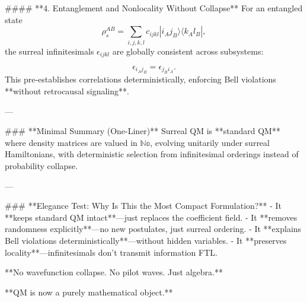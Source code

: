 #### **4. Entanglement and Nonlocality Without Collapse**  
For an entangled state  
\[
\rho_s^{AB} = \sum_{i,j,k,l} c_{ijkl} |i_A j_B\rangle \langle k_A l_B|,
\]
the surreal infinitesimals \( \epsilon_{ijkl} \) are globally consistent across subsystems:  

\[
\epsilon_{i_A j_B} = \epsilon_{j_B i_A}.
\]
This pre-establishes correlations deterministically, enforcing Bell violations **without retrocausal signaling**.

---

### **Minimal Summary (One-Liner)**  
Surreal QM is **standard QM** where density matrices are valued in \( \mathbb{No} \), evolving unitarily under surreal Hamiltonians, with deterministic selection from infinitesimal orderings instead of probability collapse.  

---

### **Elegance Test: Why Is This the Most Compact Formulation?**  
- It **keeps standard QM intact**—just replaces the coefficient field.
- It **removes randomness explicitly**—no new postulates, just surreal ordering.
- It **explains Bell violations deterministically**—without hidden variables.
- It **preserves locality**—infinitesimals don’t transmit information FTL.

**No wavefunction collapse. No pilot waves. Just algebra.**  

**QM is now a purely mathematical object.**
